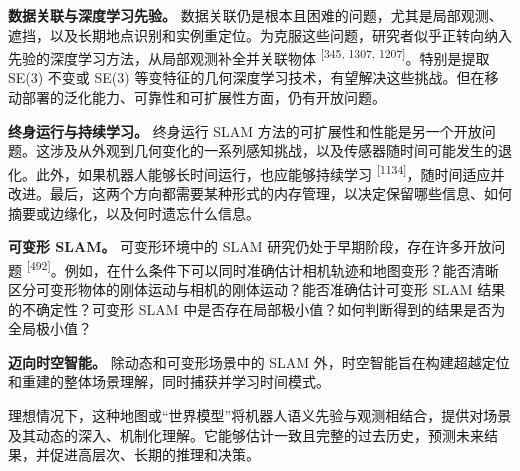 \textbf{数据关联与深度学习先验。} 数据关联仍是根本且困难的问题，尤其是局部观测、遮挡，以及长期地点识别和实例重定位。为克服这些问题，研究者似乎正转向纳入先验的深度学习方法，从局部观测补全并关联物体 \textsuperscript{[345, 1307, 1207]}。特别是提取 SE(3) 不变或 SE(3) 等变特征的几何深度学习技术，有望解决这些挑战。但在移动部署的泛化能力、可靠性和可扩展性方面，仍有开放问题。

\textbf{终身运行与持续学习。} 终身运行 SLAM 方法的可扩展性和性能是另一个开放问题。这涉及从外观到几何变化的一系列感知挑战，以及传感器随时间可能发生的退化。此外，如果机器人能够长时间运行，也应能够持续学习 \textsuperscript{[1134]}，随时间适应并改进。最后，这两个方向都需要某种形式的内存管理，以决定保留哪些信息、如何摘要或边缘化，以及何时遗忘什么信息。

\textbf{可变形 SLAM。} 可变形环境中的 SLAM 研究仍处于早期阶段，存在许多开放问题 \textsuperscript{[492]}。例如，在什么条件下可以同时准确估计相机轨迹和地图变形？能否清晰区分可变形物体的刚体运动与相机的刚体运动？能否准确估计可变形 SLAM 结果的不确定性？可变形 SLAM 中是否存在局部极小值？如何判断得到的结果是否为全局极小值？

\textbf{迈向时空智能。} 除动态和可变形场景中的 SLAM 外，时空智能旨在构建超越定位和重建的整体场景理解，同时捕获并学习时间模式。

理想情况下，这种地图或“世界模型”将机器人语义先验与观测相结合，提供对场景及其动态的深入、机制化理解。它能够估计一致且完整的过去历史，预测未来结果，并促进高层次、长期的推理和决策。
